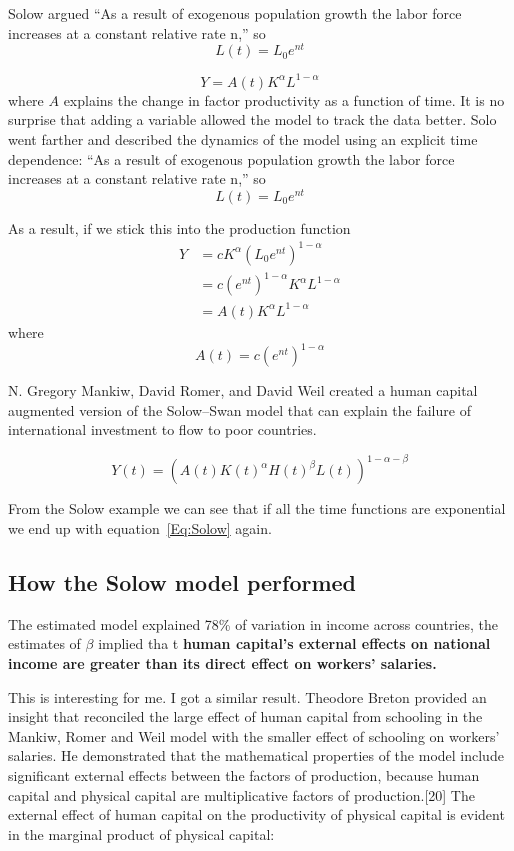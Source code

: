 Solow argued ``As a result of exogenous population growth the labor force increases at a constant relative rate n,'' so
  \[L(t)= L_0e^{nt}\]


 \[Y=A(t)K^\alpha L^{1-\alpha}\]
 where $A$  explains the change in factor productivity as a function of time. It is no surprise that adding a variable allowed the model to track the data better. Solo went farther and described the dynamics of the model using an explicit time dependence: ``As a result of exogenous population growth the labor force increases at a constant relative rate n,'' so
  \[L(t)= L_0e^{nt}\]
  
  
 As a result, if we stick this into the production function 
 \begin{eqnarray}
 Y&=cK^\alpha (L_0e^{nt})^{1-\alpha}\\
    &=c(e^{nt})^{1-\alpha}K^\alpha L^{1-\alpha}\\
    &=A(t)K^\alpha L^{1-\alpha} \label{Eq:Solow}
 \end{eqnarray}
 where
 \[A(t)=c(e^{nt})^{1-\alpha}\]
 
 N. Gregory Mankiw, David Romer, and David Weil created a human capital augmented version of the Solow–Swan model that can explain the failure of international investment to flow to poor countries.

    \[Y(t)=(A(t)K(t)^\alpha H(t)^\beta L(t))^{1-\alpha -\beta} \]
    
    From the Solow example we can see that if all the time functions are exponential we end up with equation~\ref{Eq:Solow} again.
    
\subsection{How the Solow model performed}    
The estimated model explained 78\% of variation in income across countries, the estimates of $\beta$ implied tha t\textbf{ human capital's external effects on national income are greater than its direct effect on workers' salaries.}%
    
This is interesting for me. I got a similar result. Theodore Breton provided an insight that reconciled the large effect of human capital from schooling in the Mankiw, Romer and Weil model with the smaller effect of schooling on workers' salaries. He demonstrated that the mathematical properties of the model include significant external effects between the factors of production, because human capital and physical capital are multiplicative factors of production.[20] The external effect of human capital on the productivity of physical capital is evident in the marginal product of physical capital:

